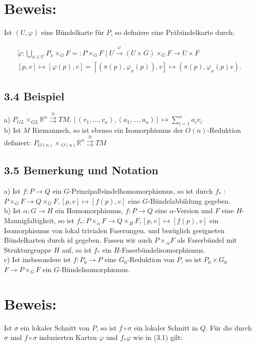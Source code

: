 \section*{Beweis:}
Ist $(U, \varphi)$ eine Bündelkarte für $P$, so definiere eine Präbündelkarte durch:


\begin{gather*}
\tilde{\varphi}: \bigcup_{x \in U} P_{x} \times_{G} F=: P \times_{G} F \mid U \xrightarrow{\varphi}(U \times G) \times_{G} F \rightarrow U \times F  \tag{3.1}\\
{[p, v] \mapsto[\varphi(p), v]=\left[\left(\pi(p), \varphi_{x}(p)\right), v\right] \mapsto\left(\pi(p), \varphi_{x}(p) v\right) .}
\end{gather*}


\subsection*{3.4 Beispiel}
a) $P_{G L} \times_{G L} \mathbb{R}^{n} \stackrel{\cong}{\rightrightarrows} T M,\left[\left(v_{1}, \ldots, v_{n}\right),\left(a_{1}, \ldots, a_{n}\right)\right] \mapsto \sum_{i=1}^{n} a_{i} v_{i}$\\
b) Ist $M$ Riemannsch, so ist ebenso ein Isomorphismus der $O(n)$-Reduktion definiert: $P_{O(n)} \times{ }_{O(n)} \mathbb{R}^{n} \stackrel{\cong}{\rightrightarrows} T M$

\subsection*{3.5 Bemerkung und Notation}
a) Ist $f: P \rightarrow Q$ ein $G$-Prinzipalbündelhomomorphismus, so ist durch $f_{*}$ : $P \times_{G} F \rightarrow Q \times_{G} F,[p, v] \mapsto[f(p), v]$ eine $G$-Bündelabbildung gegeben.\\
b) Ist $\alpha: G \rightarrow H$ ein Homomorphismus, $f: P \rightarrow Q$ eine $\alpha$-Version und $F$ eine $H$-Mannigfaltigkeit, so ist $f_{*}: P \times_{\alpha} F \rightarrow Q \times_{H} F,[p, v] \mapsto[f(p), v]$ ein Isomorphismus von lokal trivialen Faserungen. und bezüglich geeigneten Bündelkarten durch id gegeben. Fassen wir auch $P \times{ }_{\alpha} F$ als Faserbündel mit Strukturgruppe $H$ auf, so ist $f_{*}$ ein $H$-Faserbündelisomorphismus.\\
c) Ist insbesondere ist $f: P_{0} \rightarrow P$ eine $G_{0}$-Reduktion von $P$, so ist $P_{0} \times G_{0}$ $F \rightarrow P \times_{G} F$ ein $G$-Bündelisomorphismus.

\section*{Beweis:}
Ist $\sigma$ ein lokaler Schnitt von $P$, so ist $f \circ \sigma$ ein lokaler Schnitt in $Q$. Für die durch $\sigma$ und $f \circ \sigma$ induzierten Karten $\varphi$ und $f_{*} \varphi$ wie in (3.1) gilt:

